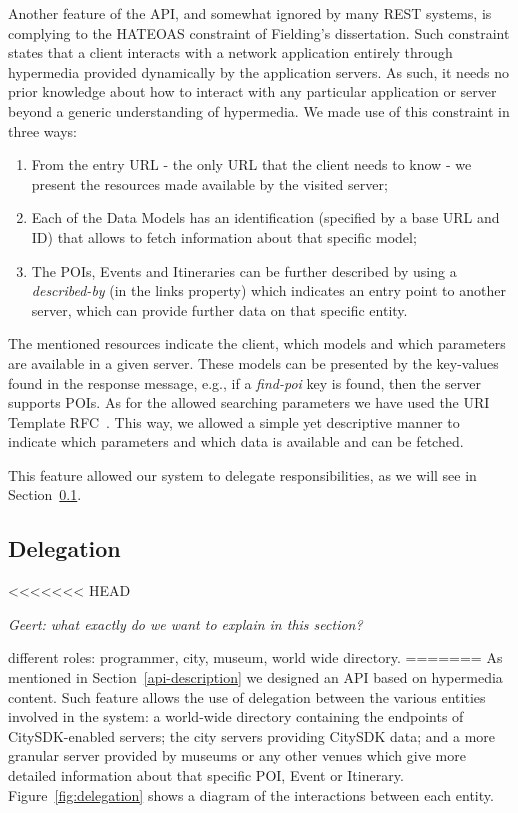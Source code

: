 \documentclass[times]{ettauth}
\begin{document}
Another feature of the API, and somewhat ignored by many REST systems, is complying to the \acf{HATEOAS} constraint of Fielding's dissertation. Such constraint states that a client interacts with a network application entirely through hypermedia provided dynamically by the application servers. As such, it needs no prior knowledge about how to interact with any particular application or server beyond a generic understanding of hypermedia. We made use of this constraint in three ways:
\begin{enumerate}
\item From the entry URL - the only URL that the client needs to know - we present the resources made available by the visited server;
\item Each of the Data Models has an identification (specified by a base URL and ID) that allows to fetch information about that specific model;
\item The POIs, Events and Itineraries can be further described by using a \textit{described-by} (in the links property) which indicates an entry point to another server, which can provide further data on that specific entity.
\end{enumerate}

The mentioned resources indicate the client, which models and which parameters are available in a given server. These models can be presented by the key-values found in the response message, e.g., if a \textit{find-poi} key is found, then the server supports POIs. As for the allowed searching parameters we have used the URI Template RFC~\cite{uri-template}. This way, we allowed a simple yet descriptive manner to indicate which parameters and which data is available and can be fetched.

This feature allowed our system to delegate responsibilities, as we will see in Section~\ref{delegation}.

\subsection{Delegation}
\label{delegation}
<<<<<<< HEAD

\emph{Geert: what exactly do we want to explain in this section?}

different roles: programmer, city, museum, world wide directory.
=======
As mentioned in Section~\ref{api-description} we designed an API based on hypermedia content. Such feature allows the use of delegation between the various entities involved in the system: a world-wide directory containing the endpoints of CitySDK-enabled servers; the city servers providing CitySDK data; and a more granular server provided by museums or any other venues which give more detailed information about that specific POI, Event or Itinerary. Figure~\ref{fig:delegation} shows a diagram of the interactions between each entity.
\end{document}
